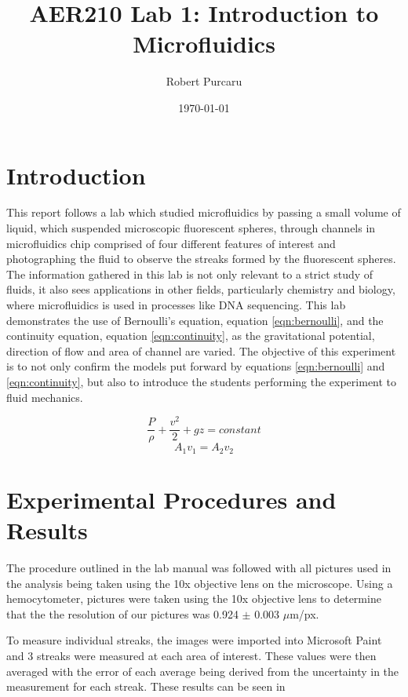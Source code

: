 \documentclass[11pt]{article}
\begin{document}
    \title{AER210 Lab 1: Introduction to Microfluidics}
        \author{Robert Purcaru}
        \date{\today}
    \maketitle

    \section{Introduction}
        This report follows a lab which studied microfluidics by passing a small volume of liquid, which suspended microscopic fluorescent spheres, through channels in microfluidics chip comprised of four different features of interest and photographing the fluid to observe the streaks formed by the fluorescent spheres. The information gathered in this lab is not only relevant to a strict study of fluids, it also sees applications in other fields, particularly chemistry and biology, where microfluidics is used in processes like DNA sequencing. This lab demonstrates the use of Bernoulli's equation, equation \ref{eqn:bernoulli}, and the continuity equation, equation \ref{eqn:continuity}, as the gravitational potential, direction of flow and area of channel are varied. The objective of this experiment is to not only confirm the models put forward by equations \ref{eqn:bernoulli} and \ref{eqn:continuity}, but also to introduce the students performing the experiment to fluid mechanics.

        \begin{equation}\label{eqn:bernoulli}
            \frac{P}{\rho} + \frac{v^2}{2} + gz = constant
        \end{equation}
        \begin{equation}\label{eqn:continuity}
            A_1v_1=A_2v_2
        \end{equation}


    \section{Experimental Procedures and Results}
        The procedure outlined in the lab manual \cite{LabManual} was followed with all pictures used in the analysis being taken using the 10x objective lens on the microscope. Using a hemocytometer, pictures were taken using the 10x objective lens to determine that the the resolution of our pictures was 0.924  $\pm$ 0.003 $\mu$m/px. 

        To measure individual streaks, the images were imported into Microsoft Paint and 3 streaks were measured at each area of interest. These values were then averaged with the error of each average being derived from the uncertainty in the measurement for each streak. These results can be seen in 
\end{document}
